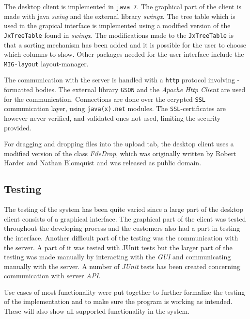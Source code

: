 The desktop client is implemented in \texttt{java 7}. The graphical part of the client is made with java \textit{swing} and the external library \textit{swingx}. The tree table which is used in the grapical interface is implemented using a modified version of the \texttt{JxTreeTable} found in \textit{swingx}. The modifications made to the \texttt{JxTreeTable} is that a sorting mechanism has been added and it is possible for the user to choose which columns to show. Other packages needed for the user interface include the \texttt{MIG-layout} layout-manager.

The communication with the server is handled with a \texttt{http} protocol involving \texttt{\json}-formatted bodies. The external library \texttt{GSON} and the \textit{Apache Http Client} are used for the communication. Connections are done over the ecrypted \texttt{SSL} communication layer, using \texttt{java(x).net} modules. The \texttt{SSL}-certificates are however never verified, and validated ones not used, limiting the security provided.

For dragging and dropping files into the upload tab, the desktop client uses a modified version of the class \textit{FileDrop}, which was originally written by Robert Harder and Nathan Blomquist and was released as public domain.

\subsection{Testing}

The testing of the system has been quite varied since a large part of the desktop client consists of a graphical interface. The graphical part of the client was tested throughout the developing process and the customers also had a part in testing the interface. Another difficult part of the testing was the communication with the server. A part of it was tested with JUnit tests but the larger part of the testing was made manually by interacting with the \textit{GUI} and communicating manually with the server.
A number of \textit{JUnit} tests has been created concerning communication with server \textit{API}.

Use cases of most functionality were put together to further formalize the testing of the implementation and to make sure the program is working as intended. These will also show all supported functionality in the system.

\FloatBarrier
